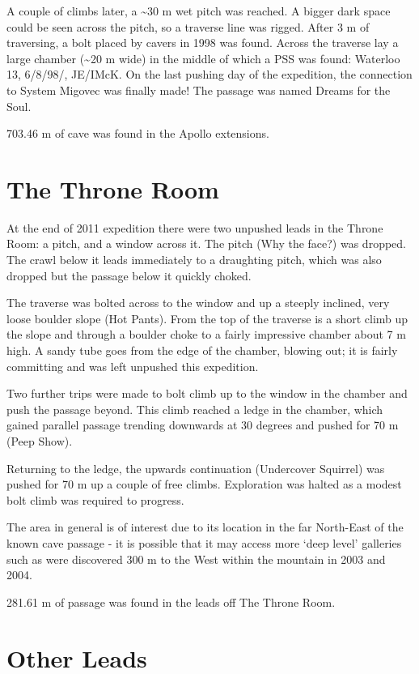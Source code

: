 A couple of climbs later, a \textasciitilde{}30 m wet pitch was reached.
A bigger dark space could be seen across the pitch, so a traverse line
was rigged. After 3 m of traversing, a bolt placed by cavers in 1998 was
found. Across the traverse lay a large chamber (\textasciitilde{}20 m
wide) in the middle of which a PSS was found: Waterloo 13, 6/8/98/,
JE/IMcK. On the last pushing day of the expedition, the connection to
System Migovec was finally made! The passage was named Dreams for the
Soul.

703.46 m of cave was found in the Apollo extensions.

\hypertarget{the-throne-room}{%
\section{The Throne Room}\label{the-throne-room}}

At the end of 2011 expedition there were two unpushed leads in the
Throne Room: a pitch, and a window across it. The pitch (Why the face?)
was dropped. The crawl below it leads immediately to a draughting pitch,
which was also dropped but the passage below it quickly choked.

The traverse was bolted across to the window and up a steeply inclined,
very loose boulder slope (Hot Pants). From the top of the traverse is a
short climb up the slope and through a boulder choke to a fairly
impressive chamber about 7 m high. A sandy tube goes from the edge of
the chamber, blowing out; it is fairly committing and was left unpushed
this expedition.

Two further trips were made to bolt climb up to the window in the
chamber and push the passage beyond. This climb reached a ledge in the
chamber, which gained parallel passage trending downwards at 30 degrees
and pushed for 70 m (Peep Show).

Returning to the ledge, the upwards continuation (Undercover Squirrel)
was pushed for 70 m up a couple of free climbs. Exploration was halted
as a modest bolt climb was required to progress.

The area in general is of interest due to its location in the far
North-East of the known cave passage - it is possible that it may access
more `deep level' galleries such as were discovered 300 m to the West
within the mountain in 2003 and 2004.

281.61 m of passage was found in the leads off The Throne Room.

\hypertarget{other-leads-1}{%
\section{Other Leads}\label{other-leads-1}}

